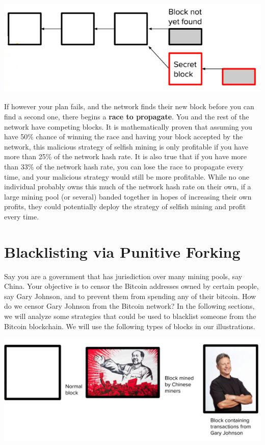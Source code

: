 \documentclass[full.tex]{subfiles}
\begin{document}
    \begin{center}
        \includegraphics[scale=0.6]{selfish}
    \end{center}
    
    If however your plan fails, and the network finds their new block before you can find a second one, there begins a \textbf{race to propagate}. You and the rest of the network have competing blocks. It is mathematically proven that assuming you have 50\% chance of winning the race and having your block accepted by the network, this malicious strategy of selfish mining is only profitable if you have more than 25\% of the network hash rate. It is also true that if you have more than 33\% of the network hash rate, you can lose the race to propagate every time, and your malicious strategy would still be more profitable. While no one individual probably owns this much of the network hash rate on their own, if a large mining pool (or several) banded together in hopes of increasing their own profits, they could potentially deploy the strategy of selfish mining and profit every time.
    
    \section*{Blacklisting via Punitive Forking}
    
    Say you are a government that has jurisdiction over many mining pools, say China. Your objective is to censor the Bitcoin addresses owned by certain people, say Gary Johnson, and to prevent them from spending any of their bitcoin. How do we censor Gary Johnson from the Bitcoin network? In the following sections, we will analyze some strategies that could be used to blacklist someone from the Bitcoin blockchain. We will use the following types of blocks in our illustrations. 
    
    \begin{center}
        \includegraphics[scale=0.3]{blacklist_block_types}
    \end{center}
    
\end{document}
